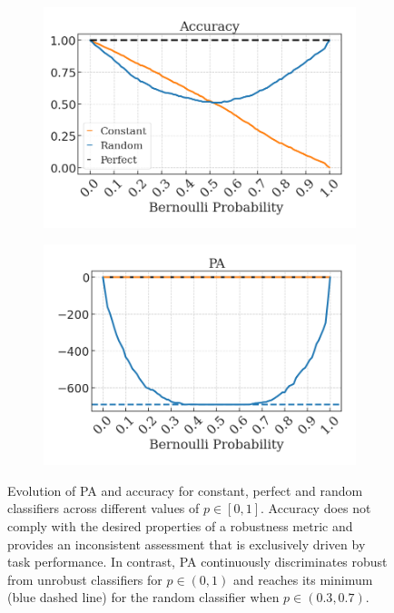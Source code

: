 \begin{figure}[t]
    \centering
    \begin{subfigure}[b]{0.45\textwidth}
        \centering
        \includegraphics[width=\textwidth]{img/results_discussion/empirical/artificial_acc_final.png}
    \end{subfigure}
    \hfill
    \begin{subfigure}[b]{0.45\textwidth}
        \centering
        \includegraphics[width=\textwidth]{img/results_discussion/empirical/artificial_logPA_final.png}
    \end{subfigure}
    \caption{
    Evolution of PA and accuracy for constant, perfect and random classifiers across different 
    values of $p \in [0,1]$. Accuracy does not comply with the desired properties of a robustness metric
    and provides an inconsistent assessment that is exclusively driven by task performance. In contrast,
    PA continuously discriminates robust from unrobust classifiers for $p \in (0,1)$ and reaches 
    its minimum (blue dashed line) for the random classifier when $p \in (0.3,0.7)$.
    }
    \label{fig:empirical_plot}
\end{figure}

